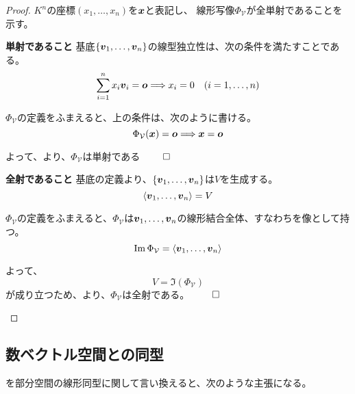 \documentclass[../../../topic_linear-algebra]{subfiles}
\begin{document}
\begin{proof}
  $K^n$の座標$(x_1,\dots,x_n)$を$\vb*{x}$と表記し、
  線形写像$\Phi_{\mathcal{V}}$が全単射であることを示す。

  \begin{subpattern}{\bfseries 単射であること}
    基底$\{ \vb*{v}_1,\dots, \vb*{v}_n \}$の線型独立性は、次の条件を満たすことである。
    \begin{equation*}
      \sum_{i=1}^n x_i \vb*{v}_i = \vb*{o} \Longrightarrow x_i = 0 \quad (i=1,\dots,n)
    \end{equation*}

    $\Phi_{\mathcal{V}}$の定義をふまえると、上の条件は、次のように書ける。
    \begin{equation*}
      \Phi_{\mathcal{V}}(\vb*{x}) = \vb*{o} \Longrightarrow \vb*{x} = \vb*{o}
    \end{equation*}

    よって、より、$\Phi_{\mathcal{V}}$は単射である $\qed$
  \end{subpattern}

  \begin{subpattern}{\bfseries 全射であること}
    基底の定義より、$\{ \vb*{v}_1, \dots, \vb*{v}_n \}$は$V$を生成する。
    \begin{equation*}
      \langle \vb*{v}_1, \dots, \vb*{v}_n \rangle = V
    \end{equation*}
    
    $\Phi_{\mathcal{V}}$の定義をふまえると、$\Phi_{\mathcal{V}}$は$\vb*{v}_1, \dots, \vb*{v}_n$の線形結合全体、すなわちを像として持つ。
    \begin{equation*}
      \Im \Phi_{\mathcal{V}} = \langle \vb*{v}_1, \dots, \vb*{v}_n \rangle
    \end{equation*}
    
    よって、
    \begin{equation*}
      V = \Im(\Phi_{\mathcal{V}})
    \end{equation*}
    が成り立つため、より、$\Phi_{\mathcal{V}}$は全射である。 $\qed$
  \end{subpattern}
\end{proof}

\subsection{数ベクトル空間との同型}

を部分空間の線形同型に関して言い換えると、次のような主張になる。
\end{document}
